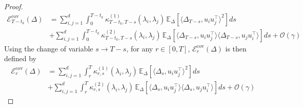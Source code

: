 \documentclass[11pt]{article}
\newcommand{\EE}{\mathbb{E}}
\begin{document}
\begin{proof}
\begin{align*}
\mathcal{E}_{T-t_k}^{\text{cov}}(\Delta) &=  \sum_{i,j=1}^d   \int_0^{T-t_k} \kappa^{(1)}_{T-t_k, T-s} (\lambda_i, \lambda_j) \, \EE_{\Delta}[\langle \Delta_{T-s}, u_iu_j^\top \rangle^2] ds  \\
&+  \sum_{i,j=1}^d  \int_0^{T-t_k} \kappa^{(2)}_{T-t_k, T-s}(\lambda_i,\lambda_j) \, \EE_{\Delta}[\langle \Delta_{T-s}, u_iu_j^\top \rangle \langle \Delta_{T-s}, u_ju_i^\top \rangle ]ds + \mathcal{O}(\gamma) \nonumber
\end{align*} 
Using the change of variable $s \to T-s$, for any $r \in [0,T]$, $\mathcal{E}_{r}^{\text{cov}}(\Delta)$ is then defined by 
\begin{align*}
\mathcal{E}_{r}^{\text{cov}}(\Delta) &=  \sum_{i,j=1}^d   \int_r^{T} \kappa^{(1)}_{r, s} (\lambda_i, \lambda_j) \, \EE_{\Delta}[\langle \Delta_{s}, u_iu_j^\top \rangle^2] ds  \\
&+  \sum_{i,j=1}^d  \int_r^{T} \kappa^{(2)}_{r, s}(\lambda_i,\lambda_j) \, \EE_{\Delta}[\langle \Delta_{s}, u_iu_j^\top \rangle \langle \Delta_{s}, u_ju_i^\top \rangle ]ds  + \mathcal{O}(\gamma)\nonumber
\end{align*} 


\end{proof}
\end{document}
